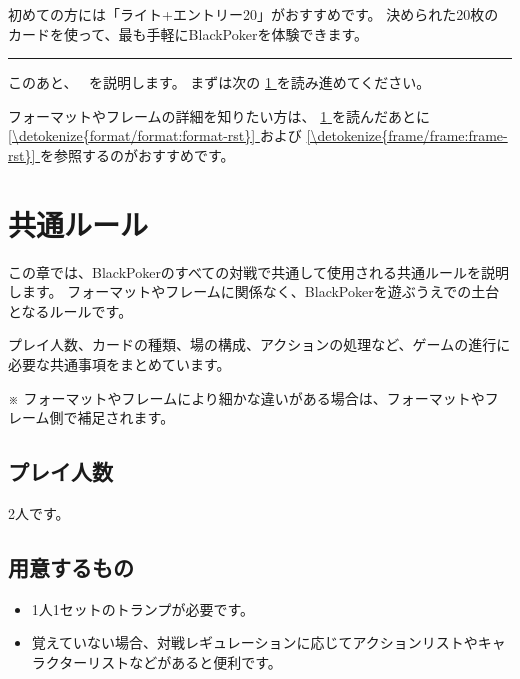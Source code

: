 \documentclass[letterpaper,10pt,dvipdfmx]{sphinxmanual}
\begin{document}
\sphinxAtStartPar
{} 初めての方には「ライト+エントリー20」がおすすめです。
決められた20枚のカードを使って、最も手軽にBlackPokerを体験できます。


\bigskip\hrule\bigskip


\sphinxAtStartPar
このあと、　 を説明します。
まずは次の \hyperref[\detokenize{common/common:common-rst}]{\ref{\detokenize{common/common:common-rst}} } を読み進めてください。

\sphinxAtStartPar
フォーマットやフレームの詳細を知りたい方は、 \hyperref[\detokenize{common/common:common-rst}]{\ref{\detokenize{common/common:common-rst}} } を読んだあとに
\hyperref[\detokenize{format/format:format-rst}]{\ref{\detokenize{format/format:format-rst}} } および \hyperref[\detokenize{frame/frame:frame-rst}]{\ref{\detokenize{frame/frame:frame-rst}} } を参照するのがおすすめです。

\sphinxstepscope


\chapter{共通ルール}
\label{\detokenize{common/common:common-rst}}\label{\detokenize{common/common:id1}}\label{\detokenize{common/common::doc}}
\sphinxAtStartPar
この章では、BlackPokerのすべての対戦で共通して使用される共通ルールを説明します。
フォーマットやフレームに関係なく、BlackPokerを遊ぶうえでの土台となるルールです。

\sphinxAtStartPar
プレイ人数、カードの種類、場の構成、アクションの処理など、ゲームの進行に必要な共通事項をまとめています。

\sphinxAtStartPar
※ フォーマットやフレームにより細かな違いがある場合は、フォーマットやフレーム側で補足されます。


\section{プレイ人数}
\label{\detokenize{common/common:id2}}
\sphinxAtStartPar
2人です。


\section{用意するもの}
\label{\detokenize{common/common:id3}}\begin{itemize}
\item {} 
\sphinxAtStartPar
1人1セットのトランプが必要です。

\item {} 
\sphinxAtStartPar
覚えていない場合、対戦レギュレーションに応じてアクションリストやキャラクターリストなどがあると便利です。

\end{itemize}
\end{document}
